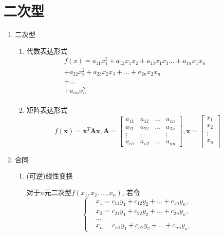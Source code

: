\chapter{二次型}
\begin{enumerate}
\item 二次型
\begin{enumerate}
\item 代数表达形式
\begin{equation*}
\begin{aligned}
f(x) = a_{11}x_{1}^{2}+a_{12}x_{1}x_{2}+a_{13}x_{1}x_{3}...+a_{1n}x_{1}x_{n} & \\
+a_{22}x_{2}^{2}+a_{23}x_{2}x_{3}+...+a_{2n}x_{2}x_{n} & \\
+\dots & \\
+a_{nn}x_{n}^{2} & \\
\end{aligned}
\end{equation*}
\item 矩阵表达形式
\begin{equation*}
f(\bm{x})=\bm{x}^{T}\bm{A}\bm{x},
\bm{A}=\begin{bmatrix}
a_{11} & a_{12} & \dots & a_{1n} \\
a_{21} & a_{22} & \dots & a_{2n} \\
\vdots & \vdots &  & \vdots \\
a_{n1} & a_{n2} & \dots & a_{nn}
\end{bmatrix},
\bm{x}=
\begin{bmatrix}
x_{1} \\
x_{2} \\
\vdots \\
x_{n} \\
\end{bmatrix}
\end{equation*}
\end{enumerate}
\item 合同
\begin{enumerate}
\item (可逆)线性变换 \par
对于$ n $元二次型$ f(x_{1}, x_{2},... ,x_{n}) $, 若令
\begin{equation*}
\left\{
\begin{aligned}
& x_{1} = c_{11}y_{1}+c_{12}y_{2}+\dots +c_{1n}y_{n}, \\
& x_{2} = c_{21}y_{1}+c_{22}y_{2}+\dots +c_{2n}y_{n}, \\
& \dots \\
& x_{n} = c_{n1}y_{1}+c_{n2}y_{2}+\dots +c_{nn}y_{n},

\end{aligned}
\end{equation*}
\end{enumerate}
\end{enumerate}
